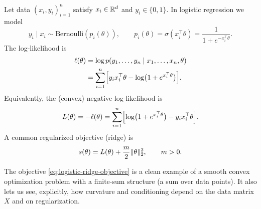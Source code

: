 \begin{example}
\label{ex:logistic-reg}
Let data $(x_i,y_i)_{i=1}^n$ satisfy $x_i \in \mathbb{R}^d$ and $y_i \in \{0,1\}$.
In logistic regression we model
\begin{equation}
  y_i \mid x_i \sim \mathrm{Bernoulli}(p_i(\theta)),
  \qquad
  p_i(\theta) = \sigma(x_i^\top \theta)
  = \frac{1}{1+e^{-x_i^\top \theta}}.
  \label{eq:logistic-model}
\end{equation}
The log-likelihood is
\begin{align}
  \ell(\theta)
  &= \log p(y_1,\dots,y_n \mid x_1,\dots,x_n,\theta) \nonumber \\
  &= \sum_{i=1}^n \Bigl[y_i x_i^\top \theta - \log\bigl(1+e^{x_i^\top \theta}\bigr)\Bigr].
  \label{eq:logistic-loglik}
\end{align}
Equivalently, the (convex) negative log-likelihood is
\begin{equation}
  L(\theta) = -\ell(\theta)
  = \sum_{i=1}^n \Bigl[\log\bigl(1+e^{x_i^\top \theta}\bigr) - y_i x_i^\top \theta\Bigr].
  \label{eq:logistic-nll}
\end{equation}
A common regularized objective (ridge) is
\begin{equation}
  s(\theta) = L(\theta) + \frac{m}{2}\lVert\theta\rVert_2^2,
  \qquad m>0.
  \label{eq:logistic-ridge-objective}
\end{equation}
\end{example}

The objective \eqref{eq:logistic-ridge-objective} is a clean example of a smooth convex optimization problem with a finite-sum structure (a sum over data points).
It also lets us see, explicitly, how curvature and conditioning depend on the data matrix $X$ and on regularization.

